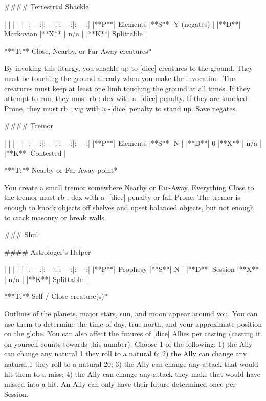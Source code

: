 #### Terrestrial Shackle

| | | | |
|:----:|:----:|:----:|:----:|
|**P**| Elements |**S**|  Y (negates) |
|**D**| Markovian |**X** |  n/a  |
|**K**| Splittable |


***T:**   Close, Nearby, or Far-Away creatures*



By invoking this liturgy, you shackle up to [dice] creatures to the ground.  They must be touching the ground already when you make the invocation.  The creatures must keep at least one limb touching the ground at all times.  If they attempt to run, they must {rb} : {dex} with a -[dice] penalty.  If they are knocked Prone, they must {rb} : {vig} with a -[dice] penalty to stand up.  Save negates.




#### Tremor

| | | | |
|:----:|:----:|:----:|:----:|
|**P**| Elements |**S**|  N |
|**D**| 0 |**X** |  n/a  |
|**K**| Contested |


***T:**   Nearby or Far Away point*



You create a small tremor somewhere Nearby or Far-Away.  Everything Close to the tremor must {rb} : {dex} with a -[dice] penalty or fall Prone.  The tremor is enough to knock objects off shelves and upset balanced objects, but not enough to crack masonry or break walls.


### Shul





#### Astrologer's Helper

| | | | |
|:----:|:----:|:----:|:----:|
|**P**| Prophesy |**S**|  N |
|**D**| Session |**X** |  n/a  |
|**K**| Splittable |


***T:**   Self / Close creature(s)*



Outlines of the planets, major stars, sun, and moon appear around you. You can use them to determine the time of day, true north, and your approximate position on the globe. You can also affect the futures of [dice] Allies per casting (casting it on yourself counts towards this number). Choose 1 of the following:  1)  the Ally can change any natural 1 they roll to a natural 6; 2) the Ally can change any natural 1 they roll to a natural 20; 3) the Ally can change any attack that would hit them to a miss; 4) the Ally can change any attack they make that would have missed into a hit.  An Ally can only have their future determined once per Session.






